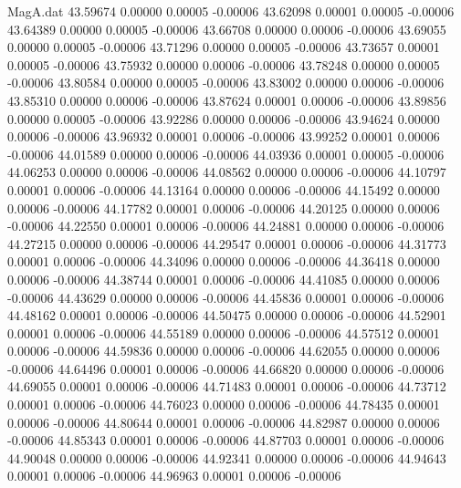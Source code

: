 \begin{filecontents}{MagA.dat}
  43.59674    0.00000    0.00005   -0.00006
  43.62098    0.00001    0.00005   -0.00006
  43.64389    0.00000    0.00005   -0.00006
  43.66708    0.00000    0.00006   -0.00006
  43.69055    0.00000    0.00005   -0.00006
  43.71296    0.00000    0.00005   -0.00006
  43.73657    0.00001    0.00005   -0.00006
  43.75932    0.00000    0.00006   -0.00006
  43.78248    0.00000    0.00005   -0.00006
  43.80584    0.00000    0.00005   -0.00006
  43.83002    0.00000    0.00006   -0.00006
  43.85310    0.00000    0.00006   -0.00006
  43.87624    0.00001    0.00006   -0.00006
  43.89856    0.00000    0.00005   -0.00006
  43.92286    0.00000    0.00006   -0.00006
  43.94624    0.00000    0.00006   -0.00006
  43.96932    0.00001    0.00006   -0.00006
  43.99252    0.00001    0.00006   -0.00006
  44.01589    0.00000    0.00006   -0.00006
  44.03936    0.00001    0.00005   -0.00006
  44.06253    0.00000    0.00006   -0.00006
  44.08562    0.00000    0.00006   -0.00006
  44.10797    0.00001    0.00006   -0.00006
  44.13164    0.00000    0.00006   -0.00006
  44.15492    0.00000    0.00006   -0.00006
  44.17782    0.00001    0.00006   -0.00006
  44.20125    0.00000    0.00006   -0.00006
  44.22550    0.00001    0.00006   -0.00006
  44.24881    0.00000    0.00006   -0.00006
  44.27215    0.00000    0.00006   -0.00006
  44.29547    0.00001    0.00006   -0.00006
  44.31773    0.00001    0.00006   -0.00006
  44.34096    0.00000    0.00006   -0.00006
  44.36418    0.00000    0.00006   -0.00006
  44.38744    0.00001    0.00006   -0.00006
  44.41085    0.00000    0.00006   -0.00006
  44.43629    0.00000    0.00006   -0.00006
  44.45836    0.00001    0.00006   -0.00006
  44.48162    0.00001    0.00006   -0.00006
  44.50475    0.00000    0.00006   -0.00006
  44.52901    0.00001    0.00006   -0.00006
  44.55189    0.00000    0.00006   -0.00006
  44.57512    0.00001    0.00006   -0.00006
  44.59836    0.00000    0.00006   -0.00006
  44.62055    0.00000    0.00006   -0.00006
  44.64496    0.00001    0.00006   -0.00006
  44.66820    0.00000    0.00006   -0.00006
  44.69055    0.00001    0.00006   -0.00006
  44.71483    0.00001    0.00006   -0.00006
  44.73712    0.00001    0.00006   -0.00006
  44.76023    0.00000    0.00006   -0.00006
  44.78435    0.00001    0.00006   -0.00006
  44.80644    0.00001    0.00006   -0.00006
  44.82987    0.00000    0.00006   -0.00006
  44.85343    0.00001    0.00006   -0.00006
  44.87703    0.00001    0.00006   -0.00006
  44.90048    0.00000    0.00006   -0.00006
  44.92341    0.00000    0.00006   -0.00006
  44.94643    0.00001    0.00006   -0.00006
  44.96963    0.00001    0.00006   -0.00006

\end{filecontents}
